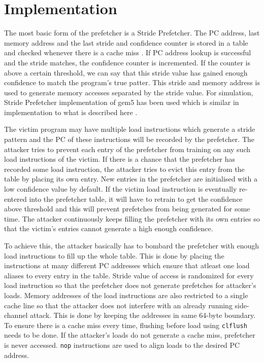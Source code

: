 \section{Implementation}

The most basic form of the prefetcher is a Stride Prefetcher. The PC address,
last memory address and the last stride and confidence counter is
stored in a table and checked whenever there is a cache miss .
If PC address lookup is successful and the stride matches,
the confidence counter is incremented.
If the counter is above a certain threshold, we can say that this stride value
has gained enough confidence to match the program's true patter. This stride
and memory address is used to generate memory accesses separated by the stride
value. For simulation, Stride Prefetcher implementation of gem5 
has been used which is similar in implementation to what is described here
.

The victim program may have multiple load instructions which generate a stride
pattern and the PC of these instructions will be recorded by the prefetcher.
The attacker tries to prevent each entry of the prefetcher from training on
any such load instructions of the victim. If there is a chance that the prefetcher
has recorded some load instruction, the attacker tries to evict this entry from
the table by placing its own entry. New entries in the prefetcher are initialised
with a low confidence value by default. If the victim load instruction is eventually
re-entered into the prefetcher table, it will have to retrain to get the confidence
above threshold and this will prevent prefetches from being generated for some time.
The attacker continuously keeps filling the prefetcher with its own entries so that
the victim's entries cannot generate a high enough confidence.


To achieve this, the attacker basically has to bombard the prefetcher with
enough load instructions to fill up the whole table.
This is done by placing the instructions at many different PC addresses
which ensure that atleast one load aliases to every entry in the table.
Stride value of access is randomized for every load instruction so that
the prefetcher does not generate prefetches for attacker's loads.
Memory addresses of the load instructions are also restricted to a single cache
line so that the attacker does not interfere with an already running
side-channel attack. This is done by keeping the addresses in same 64-byte boundary.
To ensure there is a cache miss every time, flushing before load using
\texttt{clflush} needs to be done.
If the attacker's loads do not generate a cache miss, prefetcher is never accessed.
\texttt{nop} instructions are used to align loads to the desired PC address.

